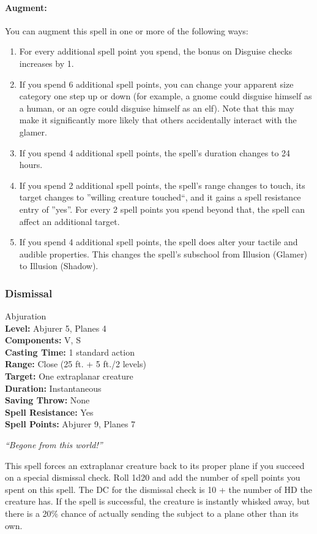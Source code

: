 \paragraph{Augment:} You can augment this spell in one or more of the following ways:
\begin{enumerate}
 \item For every additional spell point you spend, the bonus on Disguise checks increases by 1.
 \item If you spend 6 additional spell points, you can change your apparent size category one step up or down (for example, a gnome could disguise himself as a human, or an ogre could disguise himself as an elf). Note that this may make it significantly more likely that others accidentally interact with the glamer.
 \item If you spend 4 additional spell points, the spell's duration changes to 24 hours.
 \item If you spend 2 additional spell points, the spell's range changes to touch,
 its target changes to ''willing creature touched``, and it gains a spell resistance entry of ''yes''. 
 For every 2 spell points you spend beyond that, the spell can affect an additional target.
 \item  If you spend 4 additional spell points, the spell does alter your tactile and audible properties. This changes the spell's subschool from Illusion (Glamer) to Illusion (Shadow).
\end{enumerate}
\subsubsection{Dismissal}
\label{Spell:Dismissal}
Abjuration
\\ \textbf{Level:} Abjurer 5, Planes 4
\\ \textbf{Components:} V, S
\\ \textbf{Casting Time:} 1 standard action
\\ \textbf{Range:} Close (25 ft. + 5 ft./2 levels)
\\ \textbf{Target:} One extraplanar creature
\\ \textbf{Duration:} Instantaneous
\\ \textbf{Saving Throw:} None
\\ \textbf{Spell Resistance:} Yes
\\ \textbf{Spell Points:} Abjurer 9, Planes 7

\emph{``Begone from this world!''}

This spell forces an extraplanar creature back to its proper plane if you succeed on a special dismissal check. Roll 1d20 and add the number of spell points you spent on this spell.
The DC for the dismissal check is 10 + the number of HD the creature has.
If the spell is successful, the creature is instantly whisked away, but there is a 20\% chance of actually sending the subject to a plane other than its own.

